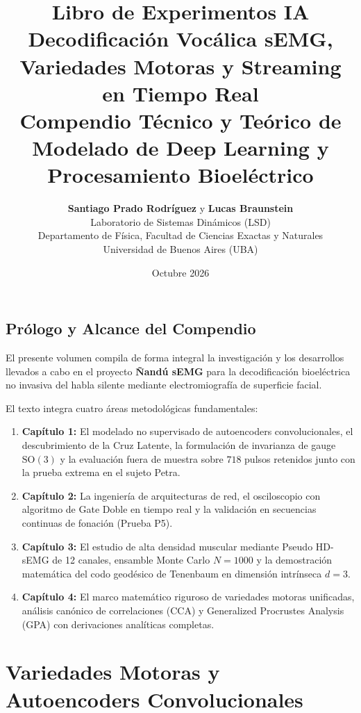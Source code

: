 \documentclass[11pt,a4paper,openany]{book}
\title{
    \vspace{-2cm}
    \textbf{\Huge Libro de Experimentos IA}\\[0.5em]
    \textbf{\Large Decodificación Vocálica sEMG, Variedades Motoras y Streaming en Tiempo Real}\\[1.5em]
    \large Compendio Técnico y Teórico de Modelado de Deep Learning y Procesamiento Bioeléctrico
}
\author{
    \textbf{\Large Santiago Prado Rodríguez} \quad y \quad \textbf{\Large Lucas Braunstein}\\[1em]
    \normalsize Laboratorio de Sistemas Dinámicos (LSD) \\
    \normalsize Departamento de Física, Facultad de Ciencias Exactas y Naturales \\
    \normalsize Universidad de Buenos Aires (UBA)
}
\date{Octubre 2026}
\theoremstyle{definition}
\begin{document}
\frontmatter
\maketitle

\chapter*{Prólogo y Alcance del Compendio}

El presente volumen compila de forma integral la investigación y los desarrollos llevados a cabo en el proyecto \textbf{Ñandú sEMG} para la decodificación bioeléctrica no invasiva del habla silente mediante electromiografía de superficie facial.

El texto integra cuatro áreas metodológicas fundamentales:
\begin{enumerate}
    \item \textbf{Capítulo 1:} El modelado no supervisado de autoencoders convolucionales, el descubrimiento de la Cruz Latente, la formulación de invarianza de gauge $\text{SO}(3)$ y la evaluación fuera de muestra sobre $718$ pulsos retenidos junto con la prueba extrema en el sujeto Petra.
    \item \textbf{Capítulo 2:} La ingeniería de arquitecturas de red, el osciloscopio con algoritmo de Gate Doble en tiempo real y la validación en secuencias continuas de fonación (Prueba P5).
    \item \textbf{Capítulo 3:} El estudio de alta densidad muscular mediante Pseudo HD-sEMG de 12 canales, ensamble Monte Carlo $N=1000$ y la demostración matemática del codo geodésico de Tenenbaum en dimensión intrínseca $d=3$.
    \item \textbf{Capítulo 4:} El marco matemático riguroso de variedades motoras unificadas, análisis canónico de correlaciones (CCA) y Generalized Procrustes Analysis (GPA) con derivaciones analíticas completas.
\end{enumerate}

\tableofcontents

\mainmatter

\part{Variedades Motoras y Autoencoders Convolucionales}
\end{document}

